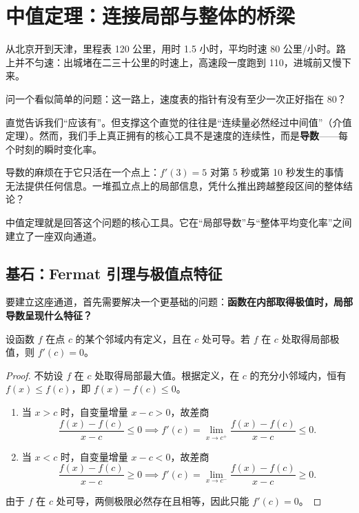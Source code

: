 \section{中值定理：连接局部与整体的桥梁}
\label{sec:02-Calculus/03-Differentiation/04}

从北京开到天津，里程表 120 公里，用时 1.5 小时，平均时速 80 公里/小时。路上并不匀速：出城堵在二三十公里的时速上，高速段一度跑到 110，进城前又慢下来。

问一个看似简单的问题：这一路上，速度表的指针有没有至少一次正好指在 80？

直觉告诉我们``应该有''。但支撑这个直觉的往往是``连续量必然经过中间值''（介值定理）。然而，我们手上真正拥有的核心工具不是速度的连续性，而是\textbf{导数}——每个时刻的瞬时变化率。

导数的麻烦在于它只活在一个点上：\(f'(3)=5\) 对第 5 秒或第 10 秒发生的事情无法提供任何信息。一堆孤立点上的局部信息，凭什么推出跨越整段区间的整体结论？

中值定理就是回答这个问题的核心工具。它在``局部导数''与``整体平均变化率''之间建立了一座双向通道。

\subsection{基石：Fermat 引理与极值点特征}

要建立这座通道，首先需要解决一个更基础的问题：\textbf{函数在内部取得极值时，局部导数呈现什么特征？}

\begin{lemma}[Fermat 引理]
设函数 \(f\) 在点 \(c\) 的某个邻域内有定义，且在 \(c\) 处可导。若 \(f\) 在 \(c\) 处取得局部极值，则 \(f'(c) = 0\)。
\end{lemma}

\begin{proof}
不妨设 \(f\) 在 \(c\) 处取得局部最大值。根据定义，在 \(c\) 的充分小邻域内，恒有 \(f(x) \le f(c)\)，即 \(f(x) - f(c) \le 0\)。
\begin{enumerate}
    \item 当 \(x > c\) 时，自变量增量 \(x - c > 0\)，故差商
    \[
    \frac{f(x) - f(c)}{x - c} \le 0 \implies f'(c) = \lim_{x \to c^+} \frac{f(x) - f(c)}{x - c} \le 0.
    \]
    \item 当 \(x < c\) 时，自变量增量 \(x - c < 0\)，故差商
    \[
    \frac{f(x) - f(c)}{x - c} \ge 0 \implies f'(c) = \lim_{x \to c^-} \frac{f(x) - f(c)}{x - c} \ge 0.
    \]
\end{enumerate}
由于 \(f\) 在 \(c\) 处可导，两侧极限必然存在且相等，因此只能 \(f'(c) = 0\)。
\end{proof}

